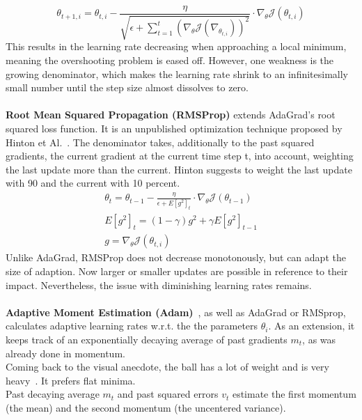 \begin{equation}
    \theta_{t+1,i} = \theta_{t,i} - \frac{\eta}{\sqrt{\epsilon+\sum_{t=1}^{t}(\nabla_\theta\mathcal{J}(\nabla_{\theta_{t,i}}))^2}} \cdot \nabla_\theta\mathcal{J}(\theta_{t,i})
    \label{eqn:adagrad}
\end{equation}
This results in the learning rate decreasing when approaching a local minimum, meaning the overshooting problem is eased off.
However, one weakness is the growing denominator, which makes the learning rate shrink to an infinitesimally small number until the step
size almost dissolves to zero.
\\\mbox{}\\
\textbf{Root Mean Squared Propagation (RMSProp)} extends AdaGrad's root squared loss function.
It is an unpublished optimization technique proposed by Hinton et Al.~\cite{rmsprop}.
The denominator takes, additionally to the past squared gradients, the current gradient at the current time step t,
into account, weighting the last update more than the current.
Hinton suggests to weight the last update with 90 and the current with 10 percent.
\begin{align}
    \theta_{t} = \theta_{t-1} - \frac{\eta}{\epsilon+E[g^2]_t} \cdot \nabla_\theta\mathcal{J}(\theta_{t-1})\label{eqn:rmsprop:1}\\
    E[g^2]_t = (1-\gamma)g^2+\gamma E[g^2]_{t-1}\label{eqn:rmsprop:2}\\
    g = \nabla_\theta\mathcal{J}(\theta_{t,i})\label{eqn:rmsprop:3}
\end{align}
Unlike AdaGrad, RMSProp does not decrease monotonously, but can adapt the size of adaption.
Now larger or smaller updates are possible in reference to their impact.
Nevertheless, the issue with diminishing learning rates remains.
\\\mbox{}\\
\textbf{Adaptive Moment Estimation (Adam)}~\cite{adam}, as well as AdaGrad or RMSprop, calculates adaptive learning rates w.r.t. the
the parameters $\theta_i$.
As an extension, it keeps track of an exponentially decaying average of past gradients $m_t$, as was already done in
momentum.\\
Coming back to the visual anecdote, the ball has a lot of weight and is very heavy~\cite{optimizersoverview}.
It prefers flat minima.\\
Past decaying average $m_t$ and past squared errors $v_t$ estimate the first momentum (the mean) and the second momentum
(the uncentered variance).

